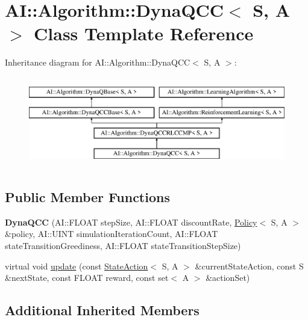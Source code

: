 \hypertarget{classAI_1_1Algorithm_1_1DynaQCC}{\section{A\-I\-:\-:Algorithm\-:\-:Dyna\-Q\-C\-C$<$ S, A $>$ Class Template Reference}
\label{classAI_1_1Algorithm_1_1DynaQCC}
}
Inheritance diagram for A\-I\-:\-:Algorithm\-:\-:Dyna\-Q\-C\-C$<$ S, A $>$\-:\begin{figure}[H]
\begin{center}
\leavevmode
\includegraphics[height=4.000000cm]{classAI_1_1Algorithm_1_1DynaQCC}
\end{center}
\end{figure}
\subsection*{Public Member Functions}
\begin{DoxyCompactItemize}
\item 
\hypertarget{classAI_1_1Algorithm_1_1DynaQCC_a5ffe7676d88f48717731c809accb7801}{{\bfseries Dyna\-Q\-C\-C} (A\-I\-::\-F\-L\-O\-A\-T step\-Size, A\-I\-::\-F\-L\-O\-A\-T discount\-Rate, \hyperlink{classAI_1_1Algorithm_1_1Policy}{Policy}$<$ S, A $>$ \&policy, A\-I\-::\-U\-I\-N\-T simulation\-Iteration\-Count, A\-I\-::\-F\-L\-O\-A\-T state\-Transition\-Greediness, A\-I\-::\-F\-L\-O\-A\-T state\-Transition\-Step\-Size)}\label{classAI_1_1Algorithm_1_1DynaQCC_a5ffe7676d88f48717731c809accb7801}

\item 
virtual void \hyperlink{classAI_1_1Algorithm_1_1DynaQCC_ae23b8f0afbb9fc5024aef9ce720c9b84}{update} (const \hyperlink{classAI_1_1StateAction}{State\-Action}$<$ S, A $>$ \&current\-State\-Action, const S \&next\-State, const F\-L\-O\-A\-T reward, const set$<$ A $>$ \&action\-Set)
\end{DoxyCompactItemize}
\subsection*{Additional Inherited Members}


